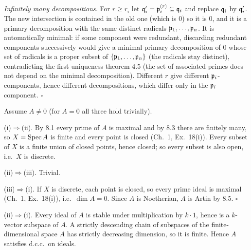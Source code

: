 \documentclass[11pt]{article}
\begin{document}
\emph{Infinitely many decompositions.} For $r\ge r_i$ let $\mathfrak q_i'=\mathfrak p_i^{(r)}\subseteq\mathfrak q_i$ and replace $\mathfrak q_i$ by $\mathfrak q_i'$. The new intersection is contained in the old one (which is $0$) so it is $0$, and it is a primary decomposition with the same distinct radicals $\mathfrak p_1,\dots,\mathfrak p_n$. It is automatically minimal: if some component were redundant, discarding redundant components successively would give a minimal primary decomposition of $0$ whose set of radicals is a proper subset of $\{\mathfrak p_1,\dots,\mathfrak p_n\}$ (the radicals stay distinct), contradicting the first uniqueness theorem 4.5 (the set of associated primes does not depend on the minimal decomposition). Different $r$ give different $\mathfrak p_i$-components, hence different decompositions, which differ only in the $\mathfrak p_i$-component. \hfill$\square$

\pf
Assume $A\ne0$ (for $A=0$ all three hold trivially).

(i)$\Rightarrow$(ii). By 8.1 every prime of $A$ is maximal and by 8.3 there are finitely many, so $X=\operatorname{Spec} A$ is finite and every point is closed (Ch.~1, Ex.~18(i)). Every subset of $X$ is a finite union of closed points, hence closed; so every subset is also open, i.e.\ $X$ is discrete.

(ii)$\Rightarrow$(iii). Trivial.

(iii)$\Rightarrow$(i). If $X$ is discrete, each point is closed, so every prime ideal is maximal (Ch.~1, Ex.~18(i)), i.e.\ $\dim A=0$. Since $A$ is Noetherian, $A$ is Artin by 8.5. \hfill$\square$

\pf
(ii)$\Rightarrow$(i). Every ideal of $A$ is stable under multiplication by $k\cdot1$, hence is a $k$-vector subspace of $A$. A strictly descending chain of subspaces of the finite-dimensional space $A$ has strictly decreasing dimension, so it is finite. Hence $A$ satisfies d.c.c.\ on ideals.
\end{document}
